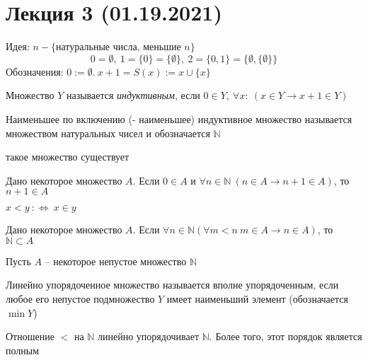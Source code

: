 
\section{Лекция 3 (01.19.2021)}
Идея: $n - \{\text{натуральные числа, меньшие } n\}$\\
$$
0 = \emptyset,\ 1 = \{0\} = \{\emptyset\},\ 2 = \{0,1\} = \{\emptyset, \{\emptyset\}\}
$$
Обозначения: $0 := \emptyset.\ x+1 = S(x) := x \cup \{x\}$

\begin{defn}
Множество $Y$ называется \textit{индуктивным}, если $0 \in Y,\ \forall x:\ (x \in Y \to x+1 \in Y)$\\
\end{defn}

\begin{defn}
Наименьшее по включению (- наименьшее) индуктивное множество называется множеством натуральных чисел и обозначается $\mathbb{N}$\\
\end{defn}

 такое множество существует\\

\begin{theo}
Дано некоторое множество $A$. Если $0 \in A$ и $\forall n \in \mathbb{N}\ (n \in A \to n+1 \in A)$, то $n+1 \in A$
\end{theo} 

 $x < y\ :\Leftrightarrow\ x \in y$\\

\begin{theo}
Дано некоторое множество $A$. Если $\forall n \in \mathbb{N} (\forall m < n\ m \in A \to n \in A)$, то $\mathbb{N} \subset A$
\end{theo}

\begin{theo}
Пусть $A$ -- некоторое непустое множество $\mathbb{N}$
\end{theo}

\begin{defn}
Линейно упорядоченное множество называется вполне упорядоченным, если любое его непустое подмножество $Y$ имеет наименьший элемент (обозначается $\min Y$)
\end{defn}

\begin{theo}
Отношение $<$ на $\mathbb{N}$ линейно упорядочивает $\mathbb{N}$. Более того, этот порядок является полным
\end{theo}


